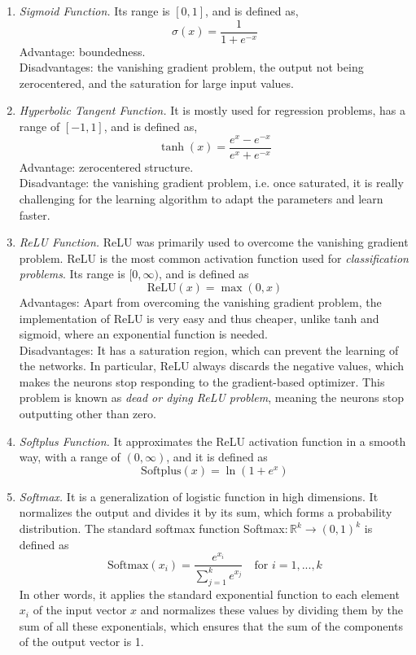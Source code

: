 \documentclass{article}
\begin{document}
\begin{enumerate}
  \item \textit{Sigmoid Function.} Its range is $[0,1]$, and is defined as,
$$\sigma(x) = \frac{1}{1 + e^{-x}}$$
Advantage: boundedness. \\ Disadvantages:
the vanishing gradient problem, the output not being zerocentered, and the saturation for large input values. 
  \item \textit{Hyperbolic Tangent Function.} It is mostly used for
regression problems, has a range of $[-1,1]$, and is defined as,
$$\tanh(x) = \frac{e^{x} - e^{-x}}{e^{x} + e^{-x}}$$
Advantage: zerocentered structure. \\
Disadvantage: the vanishing gradient problem, i.e. once saturated, it is really challenging
for the learning algorithm to adapt the parameters and learn
faster.
  \item \textit{ReLU Function.} ReLU was primarily used to overcome the vanishing gradient problem. ReLU is the most common activation function used for \textit{classification problems}. Its range is $[0, \infty)$, and is defined as
  $$\text{ReLU}(x) = \max(0, x)$$
Advantages: Apart from overcoming the vanishing gradient problem, the
implementation of ReLU is very easy and thus cheaper, unlike
tanh and sigmoid, where an exponential function is needed.
\\
Disadvantages: It has a saturation region, which can prevent the
learning of the networks. In particular, ReLU always discards
the negative values, which makes the neurons stop responding to
the gradient-based optimizer. This problem is known as \textit{dead
or dying ReLU problem}, meaning the neurons stop
outputting other than zero. 
  \item \textit{Softplus Function.} It approximates the ReLU activation function in a smooth way, with a range of $(0, \infty)$, and it is defined as
$$\text{Softplus}(x) = \ln (1+ e^x) $$
  \item \textit{Softmax.} It is a generalization of logistic
function in high dimensions. It normalizes the output and
divides it by its sum, which forms a probability distribution. The standard softmax function Softmax$: \mathbb{R}^k \to (0,1)^k$ is defined as 
$$\text{Softmax}(x_i) = \frac{e^{x_i}}{\sum^{k}_{j=1} e^{x_j}} \quad \text{for } i= 1,...,k   $$
In other words, it applies
the standard exponential function to each element $x_i$
of the input vector $x$ and normalizes these values by
dividing them by the sum of all these exponentials, which ensures that the sum of the components of the output vector is 1.
\end{enumerate}
\end{document}
